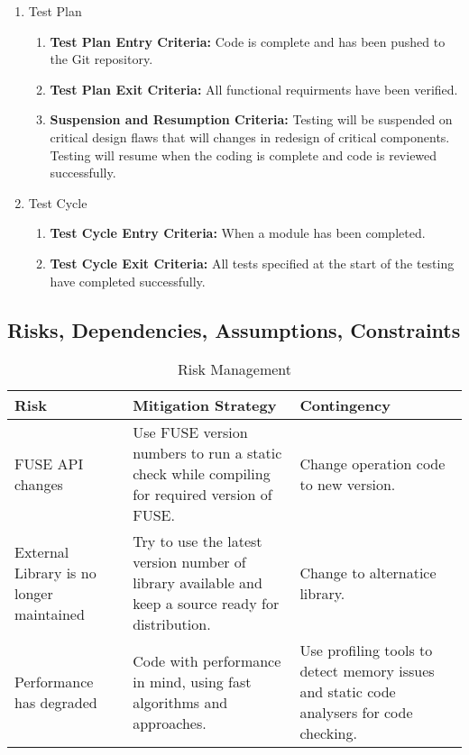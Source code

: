 \begin{enumerate}
\item Test Plan
\begin{enumerate}[label=\Alph*]
\item \textbf{Test Plan Entry Criteria:} Code is complete and has been pushed to the Git repository.
\item \textbf{Test Plan Exit Criteria:} All functional requirments have been verified.
\item \textbf{Suspension and Resumption Criteria:} Testing will be suspended on critical
design flaws that will changes in redesign of critical components. Testing will resume when the coding is complete and code is reviewed successfully.
\end{enumerate}

\item Test Cycle
\begin{enumerate}[label=\Alph*]
\item \textbf{Test Cycle Entry Criteria:} When a module has been completed.
\item\textbf{ Test Cycle Exit Criteria:} All tests specified at the start of the testing have
completed successfully.
\end{enumerate}
\end{enumerate}

\subsection{Risks, Dependencies, Assumptions, Constraints}
\begin{table}[h]
\begin{tabular}{|p{2cm}|p{8cm}|p{4cm}|}
\hline
\textbf{Risk} & \textbf{Mitigation Strategy} & \textbf{Contingency} \\ \hline \hline
FUSE API changes & Use FUSE version numbers to run a static check while compiling for required version of FUSE. & Change operation code to new version. \\ \hline
External Library is no longer maintained & Try to use the latest version number of library available and keep a source ready for distribution. & Change to alternatice library. \\ \hline
Performance has degraded & Code with performance in mind, using fast algorithms and approaches. & Use profiling tools to detect memory issues and static code analysers for code checking. \\
\hline
\end{tabular}
\caption{Risk Management}
\label{tab: risk}
\end{table}


